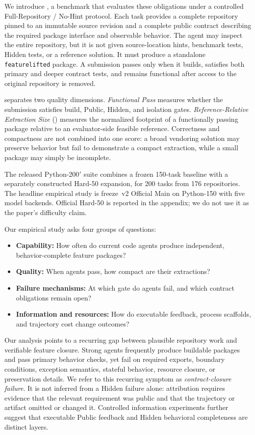 We introduce \flb, a benchmark that evaluates these obligations under a
controlled Full-Repository / No-Hint protocol. Each task provides a complete
repository pinned to an immutable source revision and a complete public
contract describing the required package interface and observable behavior.
The agent may inspect the entire repository, but it is not given source-location
hints, benchmark tests, Hidden tests, or a reference solution. It must produce
a standalone \texttt{featurelifted} package. A submission passes only when it
builds, satisfies both primary and deeper contract tests, and remains functional
after access to the original repository is removed.

\flb separates two quality dimensions. \emph{Functional Pass} measures whether
the submission satisfies build, Public, Hidden, and isolation gates.
\emph{Reference-Relative Extraction Size} (\rres) measures the normalized
footprint of a functionally passing package relative to an evaluator-side
feasible reference. Correctness and compactness are not combined into one
score: a broad vendoring solution may preserve behavior but fail to demonstrate
a compact extraction, while a small package may simply be incomplete.

The released Python-200$'$ suite combines a frozen 150-task baseline with a
separately constructed Hard-50 expansion, for 200 tasks from 176 repositories.
The headline empirical study is freeze~v2 Official Main on Python-150 with
five model backends. Official Hard-50 is reported in the appendix; we do not
use it as the paper's difficulty claim.

Our empirical study asks four groups of questions:
\begin{itemize}
  \item \textbf{Capability:} How often do current code agents produce
        independent, behavior-complete feature packages?
  \item \textbf{Quality:} When agents pass, how compact are their extractions?
  \item \textbf{Failure mechanisms:} At which gate do agents fail, and which
        contract obligations remain open?
  \item \textbf{Information and resources:} How do executable feedback,
        process scaffolds, and trajectory cost change outcomes?
\end{itemize}

Our analysis points to a recurring gap between plausible repository work and
verifiable feature closure. Strong agents frequently produce buildable packages
and pass primary behavior checks, yet fail on required exports, boundary
conditions, exception semantics, stateful behavior, resource closure, or
preservation details. We refer to this recurring symptom as
\emph{contract-closure failure}. It is not inferred from a Hidden failure alone:
attribution requires evidence that the relevant requirement was public and that
the trajectory or artifact omitted or changed it. Controlled information
experiments further suggest that executable Public feedback and Hidden
behavioral completeness are distinct layers.

